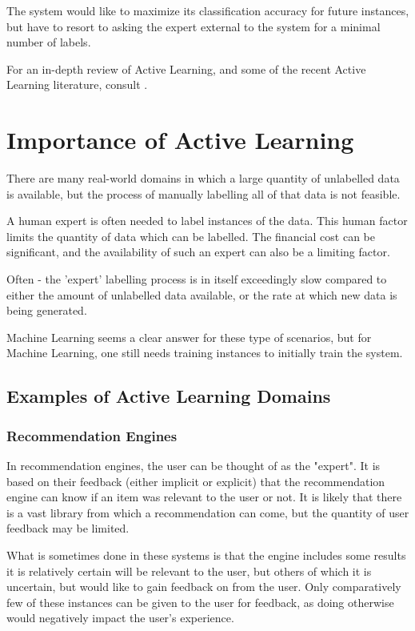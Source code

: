 \documentclass[a4paper,11pt]{report}
\begin{document}
The system would like to maximize its classification accuracy for future instances, but have to resort to asking the expert external to the system for a minimal number of labels.

For an in-depth review of Active Learning, and some of the recent Active Learning literature, consult \citep{Settles2010}.

\section{Importance of Active Learning}
There are many real-world domains in which a large quantity of unlabelled data is available, but the process of manually labelling all of that data is not feasible. 

A human expert is often needed to label instances of the data. This human factor limits the quantity of data which can be labelled. The financial cost can be significant, and the availability of such an expert can also be a limiting factor.

Often - the 'expert' labelling process is in itself exceedingly slow compared to either the amount of unlabelled data available, or the rate at which new data is being generated. 

Machine Learning seems a clear answer for these type of scenarios, but for Machine Learning, one still needs training instances to initially train the system.

\subsection{Examples of Active Learning Domains}
\subsubsection{Recommendation Engines}
In recommendation engines, the user can be thought of as the "expert". It is based on their feedback (either implicit or explicit) that the recommendation engine can know if an item was relevant to the user or not. It is likely that there is a vast library from which a recommendation can come, but the quantity of user feedback may be limited.

What is sometimes done in these systems is that the engine includes some results it is relatively certain will be relevant to the user, but others of which it is uncertain, but would like to gain feedback on from the user. Only comparatively few of these instances can be given to the user for feedback, as doing otherwise would negatively impact the user's experience.
\end{document}
